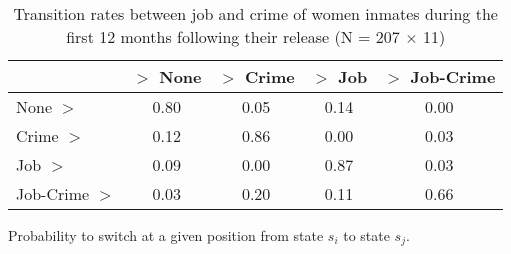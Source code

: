 \begin{table}[htp]
\footnotesize
\setlength{\tabcolsep}{10pt}
\renewcommand{\arraystretch}{1.3}
\begin{threeparttable}
\centering
\caption{Transition rates between job and crime of women inmates \newline
    during the first 12 months following their release (N = 207 $\times$ 11)} 
\label{tab:transition_rates_anyjob_crime}
\begin{tabular}{lcccc}
  \hline
 & $>$ None & $>$ Crime & $>$ Job & $>$ Job-Crime \\ 
  \hline
None $>$ & 0.80 & 0.05 & 0.14 & 0.00 \\ 
  Crime $>$ & 0.12 & 0.86 & 0.00 & 0.03 \\ 
  Job $>$ & 0.09 & 0.00 & 0.87 & 0.03 \\ 
  Job-Crime $>$ & 0.03 & 0.20 & 0.11 & 0.66 \\ 
   \hline
\end{tabular}
\begin{tablenotes}
\scriptsize
\item Probability to switch at a given position from state $s_i$ to state $s_j$.
\end{tablenotes}
\end{threeparttable}
\end{table}
